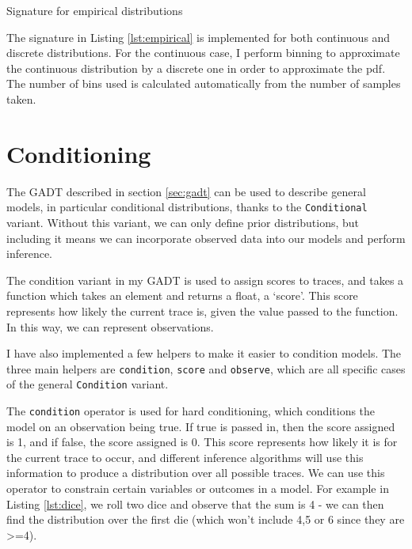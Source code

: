 \documentclass[sigconf]{acmart}
\begin{document}

\begin{listing}[ht]
  \caption{Signature for empirical distributions}
  \label{lst:empirical}
\end{listing}

The signature in Listing \ref{lst:empirical} is implemented for both continuous and discrete distributions. For the continuous case, I perform binning to approximate the continuous distribution by a discrete one in order to approximate the pdf. The number of bins used is calculated automatically from the number of samples taken.

\section{Conditioning} \label{sec:condition}

The GADT described in section \ref{sec:gadt} can be used to describe general models, in particular conditional distributions, thanks to the \texttt{Conditional} variant. Without this variant, we can only define prior distributions, but including it means we can incorporate observed data into our models and perform inference.

The condition variant in my GADT is used to assign scores to traces, and takes a function which takes an element and returns a float, a `score'. This score represents how likely the current trace is, given the value passed to the function. In this way, we can represent observations.

I have also implemented a few helpers to make it easier to condition models. The three main helpers are \texttt{condition}, \texttt{score} and \texttt{observe}, which are all specific cases of the general \texttt{Condition} variant.

The \texttt{condition} operator is used for hard conditioning, which conditions the model on an observation being true. If true is passed in, then the score assigned is 1, and if false, the score assigned is 0. This score represents how likely it is for the current trace to occur, and different inference algorithms will use this information to produce a distribution over all possible traces. We can use this operator to constrain certain variables or outcomes in a model. For example in Listing \ref{lst:dice}, we roll two dice and observe that the sum is 4 - we can then find the distribution over the first die (which won't include 4,5 or 6 since they are >=4).
\end{document}
